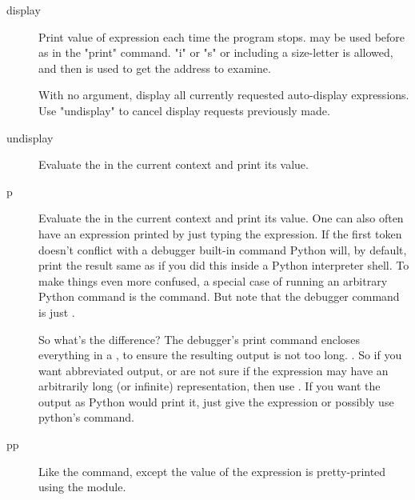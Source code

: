 \begin{description}

\item[display  ]

Print value of expression  each time the program
stops.   may be used before  as in the
"print" command.   "i" or "s" or including a size-letter
is allowed, and then  is used to get the address to
examine.

With no argument, display all currently requested auto-display
expressions.  Use "undisplay" to cancel display requests previously
made.

\item[undisplay  ]

Evaluate the  in the current context and print its
value.  


\item[p ]

Evaluate the  in the current context and print its
value. One can also often have an expression printed by just typing
the expression. If the first token doesn't conflict with a debugger
built-in command Python will, by default, print the result same as if
you did this inside a Python interpreter shell. To make things even
more confused, a special case of running an arbitrary Python command
is the  command. But note that the debugger command is
just .

So what's the difference? The debugger's print command encloses
everything in a , to ensure the resulting output is not
too long.  \emph{}. So if you want abbreviated output, or are not
sure if the expression may have an arbitrarily long (or infinite)
representation, then use . If you want the output as Python
would print it, just give the expression or possibly use python's
 command.

\item[pp ]

Like the  command, except the value of the expression is
pretty-printed using the 
 module.


\end{description}
